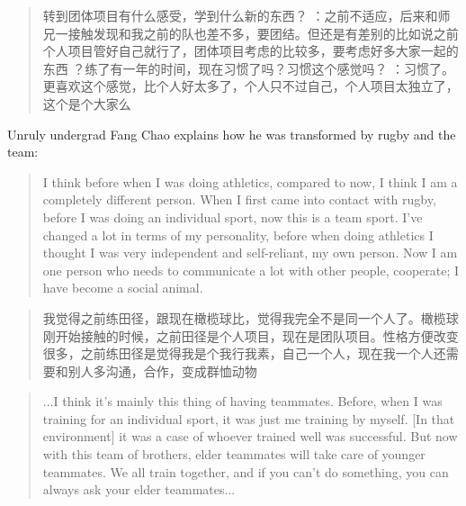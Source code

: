           \begin{CJK}{UTF8}{gbsn}
          \begin{quotation}
            转到团体项目有什么感受，学到什么新的东西？
           ：之前不适应，后来和师兄一接触发现和我之前的队也差不多，要团结。但还是有差别的比如说之前个人项目管好自己就行了，团体项目考虑的比较多，要考虑好多大家一起的东西
           ？练了有一年的时间，现在习惯了吗？习惯这个感觉吗？
           ：习惯了。更喜欢这个感觉，比个人好太多了，个人只不过自己，个人项目太独立了，这个是个大家么
          \end{quotation}
          \end{CJK}


          Unruly undergrad Fang Chao explains how he was transformed by rugby and the team:

          \begin{quotation}
            I think before when I was doing athletics, compared to now, I think I am a completely different person.  When I first came into contact with rugby, before I was doing an individual sport, now this is a team sport. I've changed a lot in terms of my personality, before when doing athletics I thought I was very independent and self-reliant, my own person.  Now I am one person who needs to communicate a lot with other people, cooperate; I have become a social animal.
          \end{quotation}

          \begin{CJK}{UTF8}{gbsn}
            \begin{quotation}
              我觉得之前练田径，跟现在橄榄球比，觉得我完全不是同一个人了。橄榄球刚开始接触的时候，之前田径是个人项目，现在是团队项目。性格方便改变很多，之前练田径是觉得我是个我行我素，自己一个人，现在我一个人还需要和别人多沟通，合作，变成群恤动物
            \end{quotation}
          \end{CJK}


          \begin{quotation}
            ...I think it's mainly this thing of having teammates. Before, when I was training for an individual sport, it was just me training by myself. [In that environment] it was a case of whoever trained well was successful.  But now with this team of brothers, elder teammates will take care of younger teammates. We all train together, and if you can’t do something, you can always ask your elder teammates...
          \end{quotation}

